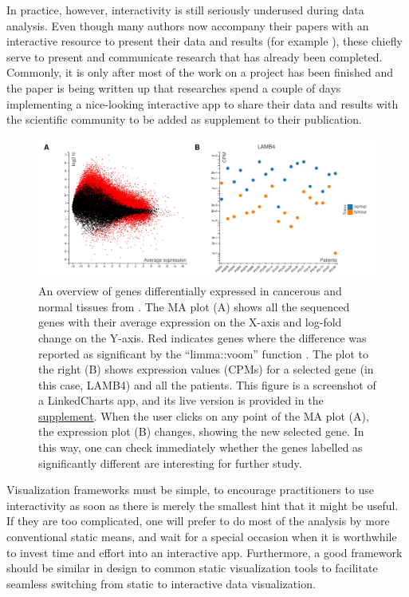 \documentclass[twocolumn,10pt]{article}
\newcommand{\supplement}{\href{https://anders-biostat.github.io/lc-paper/}{supplement}}
\begin{document}
In practice, however, interactivity is still seriously underused during data analysis. Even though many authors now accompany their papers with an interactive resource to present their data and results (for example \citet{travaglini_2020, roider_2020, kalucka_2020}), these chiefly serve to present and communicate research that has already been completed. Commonly, it is only after most of the work on a project has been finished and the paper is being written up that researches spend a couple of days implementing a nice-looking interactive app to share their data and results with the scientific community \citep{batch_2017} to be added as supplement to their publication. 

\begin{figure}[b]
	\includegraphics[width=\textwidth]{FigD/figD.png}
	\caption{An overview of genes differentially expressed in cancerous and normal tissues from \citet{conway_2015}. The MA plot (A) shows all the sequenced genes with their average expression on the X-axis and log-fold change on the Y-axis. Red indicates genes where the difference was reported as significant by the ``limma::voom'' function \citep{law_2014}. The plot to the right (B) shows expression values (CPMs) for a selected gene (in this case, LAMB4) and all the patients. This figure is a screenshot of a LinkedCharts app, and its live version is provided in the \supplement. When the user clicks on any point of the MA plot (A), the expression plot (B) changes, showing the new selected gene. In this way, one can check immediately whether the genes labelled as significantly different are interesting for further study.}  
	\label{FigD}
\end{figure}

Visualization frameworks must be simple, to encourage practitioners to use interactivity as soon as there is merely the smallest hint that it might be useful. If they are too complicated, one will prefer to do most of the analysis by more conventional static means, and wait for a special occasion when it is worthwhile to invest time and effort into an interactive app. Furthermore, a good framework should be similar in design to common static visualization tools to facilitate seamless switching from static to interactive data visualization.
\end{document}
